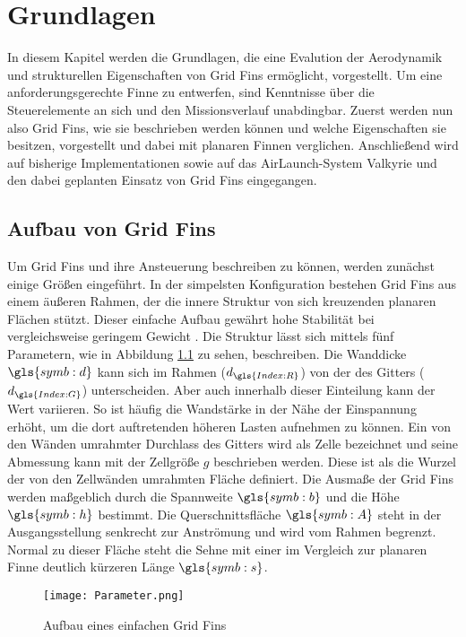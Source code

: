 \chapter{Grundlagen}
\label{sec:grundlagen}
In diesem Kapitel werden die Grundlagen, die eine Evalution der Aerodynamik und strukturellen Eigenschaften von Grid Fins ermöglicht, vorgestellt. Um eine anforderungsgerechte Finne zu entwerfen, sind Kenntnisse über die Steuerelemente an sich und den Missionsverlauf unabdingbar.
Zuerst werden nun also Grid Fins, wie sie beschrieben werden können und welche Eigenschaften sie besitzen, vorgestellt und dabei mit planaren Finnen verglichen. Anschließend wird auf bisherige Implementationen sowie auf das AirLaunch-System Valkyrie und den dabei geplanten Einsatz von Grid Fins eingegangen.
\section{Aufbau von Grid Fins}
Um Grid Fins und ihre Ansteuerung beschreiben zu können, werden zunächst einige Größen eingeführt.
In der simpelsten Konfiguration bestehen Grid Fins aus einem äußeren Rahmen, der die innere Struktur von sich kreuzenden planaren Flächen stützt. Dieser einfache Aufbau gewährt hohe Stabilität bei vergleichsweise geringem Gewicht \cite{zellform}.
Die Struktur lässt sich mittels fünf Parametern, wie in Abbildung \ref{abb_parameter} zu sehen, beschreiben. Die Wanddicke $\gls{symb:d}$ kann sich im Rahmen ($d_{\gls{Index:R}}$) von der des Gitters ($d_{\gls{Index:G}}$) unterscheiden. Aber auch innerhalb dieser Einteilung kann der Wert variieren. So ist häufig die Wandstärke in der Nähe der Einspannung erhöht, um die dort auftretenden höheren Lasten aufnehmen zu können. Ein von den Wänden umrahmter Durchlass des Gitters wird als Zelle bezeichnet und seine Abmessung kann mit der Zellgröße $g$ beschrieben werden. Diese ist als die Wurzel der von den Zellwänden umrahmten Fläche definiert. Die Ausmaße der Grid Fins werden maßgeblich durch die Spannweite $\gls{symb:b}$ und die Höhe $\gls{symb:h}$ bestimmt. Die Querschnittsfläche $\gls{symb:A}$ steht in der Ausgangsstellung senkrecht zur Anströmung und wird vom Rahmen begrenzt. Normal zu dieser Fläche steht die Sehne mit einer im Vergleich zur planaren Finne deutlich kürzeren Länge $\gls{symb:s}$.
\begin{figure}[h]
	\centering
	\texttt{[image: Parameter.png]}
	\caption{Aufbau eines einfachen Grid Fins}
	\label{abb_parameter}
\end{figure}\\
